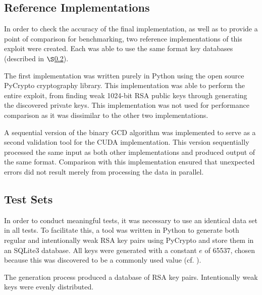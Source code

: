 \documentclass[10pt, conference]{./IEEEtran}
\begin{document}
\subsection{Reference Implementations}
In order to check the accuracy of the final implementation, as well as to 
provide a point of comparison for benchmarking, two reference implementations 
of this exploit were created. Each was able to use the same format key 
databases (described in $\S$\ref{sec:testSets}). 

The first implementation was written purely in Python using the open source
PyCrypto cryptography library. %
This 
implementation was able to perform the entire exploit, from finding 
weak 1024-bit RSA 
public keys through generating the discovered private keys. 
This implementation was not used for performance 
comparison as it was dissimilar to the other two implementations.

A sequential version of the binary GCD algorithm was implemented to serve as a 
second validation tool for the CUDA implementation. This version sequentially 
processed the same input as both other implementations and produced output of the 
same format. Comparison with this implementation ensured that unexpected errors 
did not result merely from processing the data in parallel.

\subsection{Test Sets}
\label{sec:testSets}
In order to conduct meaningful tests, it was necessary to use an identical 
data set in all tests. To facilitate this, a tool was written in Python to 
generate both regular and intentionally weak RSA key pairs using PyCrypto and store them in an SQLite3 database. All keys were generated with a 
constant $e$ of 65537, chosen because this was discovered to be a commonly used 
value (cf. \cite{lenstra:ron}).

The generation process produced a database of RSA key pairs. 
Intentionally weak keys were evenly distributed. 
\end{document}
